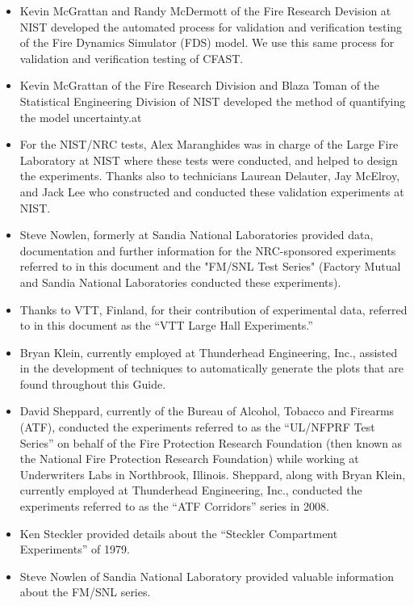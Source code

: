 \documentclass[12pt]{book}
\begin{document}
\begin{itemize}
\item Kevin McGrattan and Randy McDermott of the Fire Research Devision at NIST developed the automated process for validation and verification testing of the Fire Dynamics Simulator (FDS) model.  We use this same process for validation and verification testing of CFAST.

\item Kevin McGrattan of the Fire Research Division and Blaza Toman of the Statistical Engineering Division of NIST developed the method of quantifying the model uncertainty.at
\item For the NIST/NRC tests, Alex Maranghides was in charge of the Large Fire Laboratory at NIST where these tests were conducted, and helped to design the experiments. Thanks also to technicians Laurean Delauter, Jay McElroy, and Jack Lee who constructed and conducted these validation experiments at NIST.

\item Steve Nowlen, formerly at Sandia National Laboratories provided data, documentation and further information for the NRC-sponsored experiments referred to in this document and the "FM/SNL Test Series" (Factory Mutual and Sandia National Laboratories conducted these experiments).

\item Thanks to VTT, Finland, for their contribution of experimental data, referred to in this document as the ``VTT Large Hall Experiments.''

\item Bryan Klein, currently employed at Thunderhead Engineering, Inc., assisted in the development of techniques to automatically generate the plots that are found throughout this Guide.

\item David Sheppard, currently of the Bureau of Alcohol, Tobacco and Firearms (ATF), conducted the experiments referred to as the ``UL/NFPRF Test Series'' on behalf of the Fire Protection Research Foundation (then known as the National Fire Protection Research Foundation) while working at Underwriters Labs in Northbrook, Illinois. Sheppard, along with Bryan Klein, currently employed at Thunderhead Engineering, Inc., conducted the experiments referred to as the ``ATF Corridors'' series in 2008.


\item Ken Steckler provided details about the ``Steckler Compartment Experiments'' of 1979.

\item Steve Nowlen of Sandia National Laboratory provided valuable information about the FM/SNL series.


\end{itemize}
\end{document}
